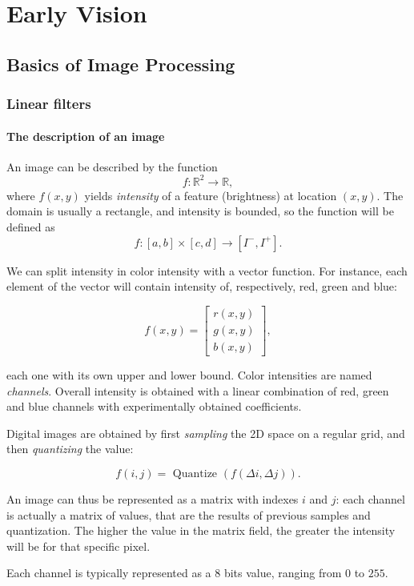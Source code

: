 \documentclass[10pt]{report}
\begin{document}
\part{Early Vision}
\label{sec:orgd85bc00}
\chapter{Basics of Image Processing}
\label{basics-of-image-processing}
\section{Linear filters}
\label{linear-filters}
\subsection{The description of an image}
\label{the-description-of-an-image}
An image can be described by the function
\[f: \mathbb{R}^2 \longrightarrow \mathbb{R},\] where \(f(x, y)\) yields
\emph{intensity} of a feature (brightness) at location \((x, y)\). The domain
is usually a rectangle, and intensity is bounded, so the function will
be defined as \[f:[a, b] \times [c, d] \longrightarrow [I^-, I^+].\]

We can split intensity in color intensity with a vector function. For
instance, each element of the vector will contain intensity of,
respectively, red, green and blue:

\[f(x, y) = \begin{bmatrix} r(x, y)\\ g(x, y)\\ b(x, y) \end{bmatrix}, \]

each one with its own upper and lower bound. Color intensities are named
\emph{channels}. Overall intensity is obtained with a linear combination of
red, green and blue channels with experimentally obtained coefficients.

Digital images are obtained by first \emph{sampling} the 2D space on a
regular grid, and then \emph{quantizing} the value:

\[ f(i, j) = \mbox{ Quantize }(f(\Delta i, \Delta j)).\]

An image can thus be represented as a matrix with indexes \(i\) and
\(j\): each channel is actually a matrix of values, that are the results
of previous samples and quantization. The higher the value in the matrix
field, the greater the intensity will be for that specific pixel.

Each channel is typically represented as a \(8\) bits value, ranging
from \(0\) to \(255\).
\end{document}
